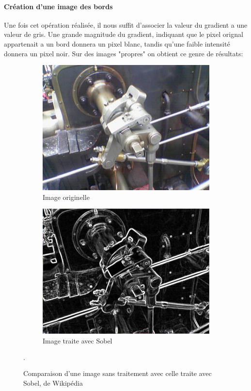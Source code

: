 \documentclass[a4paper, 12pt, titlepage, oneside, french]{article}
\begin{document}
	\paragraph{\textbf{Création d'une image des bords}}
	Une fois cet opération réalisée, il nous suffit d'associer la valeur du gradient a une valeur de gris. Une grande magnitude du gradient, indiquant que le pixel orignal appartenait a un bord donnera un pixel blanc, tandis qu'une faible intensité donnera un pixel noir.
	Sur des images "propres" on obtient ce genre de résultats:
	\begin{figure}[H]
		\centering
		\begin{subfigure}[]{0.4\linewidth}
			\includegraphics[width=\linewidth]{ValveOriginal.png}
			\caption{Image originelle}
		\end{subfigure}
		\begin{subfigure}[]{0.4\linewidth}
			\includegraphics[width=\linewidth]{ValveSobel.png}
			\caption{Image traite avec Sobel}
		\end{subfigure}
		\caption{Comparaison d'une image sans traitement avec celle traite avec Sobel, de Wikipédia \cite{WikiCannyOriginal}\cite{WikiSobel}}. 
		\label{fig:SobelGood}
	\end{figure}
\end{document}
